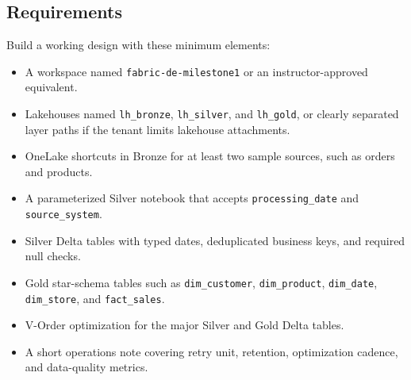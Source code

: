 \subsection*{Requirements}
Build a working design with these minimum elements:
\begin{itemize}
    \item A workspace named \texttt{fabric-de-milestone1} or an instructor-approved equivalent.
    \item Lakehouses named \texttt{lh\_bronze}, \texttt{lh\_silver}, and \texttt{lh\_gold}, or clearly separated layer paths if the tenant limits lakehouse attachments.
    \item OneLake shortcuts in Bronze for at least two sample sources, such as orders and products.
    \item A parameterized Silver notebook that accepts \texttt{processing\_date} and \texttt{source\_system}.
    \item Silver Delta tables with typed dates, deduplicated business keys, and required null checks.
    \item Gold star-schema tables such as \texttt{dim\_customer}, \texttt{dim\_product}, \texttt{dim\_date}, \texttt{dim\_store}, and \texttt{fact\_sales}.
    \item V-Order optimization for the major Silver and Gold Delta tables.
    \item A short operations note covering retry unit, retention, optimization cadence, and data-quality metrics.
\end{itemize}

